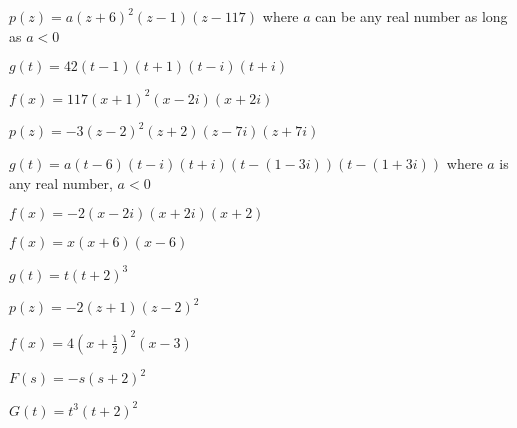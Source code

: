 \begin{exenum}
\item $p(z) = a(z+6)^2(z-1)(z-117)$ where $a$ can be any real number as long as $a<0$

\item $g(t) = 42(t-1)(t+1)(t-i)(t+i)$

\item $f(x) = 117(x+1)^2(x-2i)(x+2i)$

\item  $p(z) = -3(z-2)^2(z+2)(z-7i)(z+7i)$

\item $g(t) = a(t-6)(t-i)(t+i)(t-(1-3i))(t-(1+3i))$ where $a$ is any real number,  $a < 0$

\item $f(x) = -2(x-2i)(x+2i)(x+2)$

\end{exenum}

\begin{shortexenum}[$p(z) = -2(z+1)(z-2)^2$]
\item $f(x) = x(x+6)(x-6)$
\item $g(t) = t(t+2)^3$
\item $p(z) = -2(z+1)(z-2)^2$
\item $f(x) = 4\left(x+ \frac{1}{2}\right)^2 (x-3)$
\item $F(s)  =-s(s+2)^2$
\item $G(t) = t^3(t+2)^2$
\end{shortexenum}

